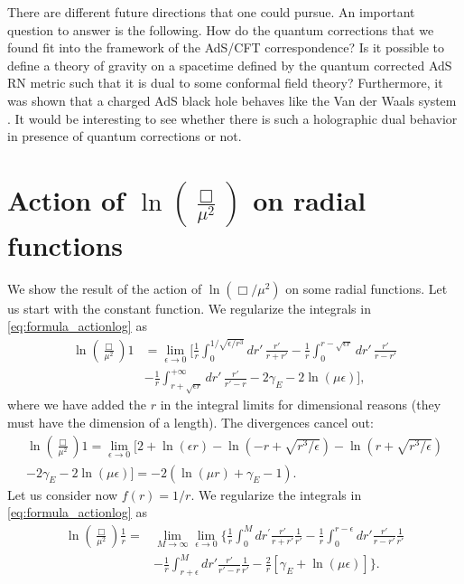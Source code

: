 \documentclass[10pt,a4paper]{article}
\begin{document}
There are different future directions that one could pursue. An important question to answer is the following. How do the quantum corrections that we found fit into the framework of the AdS/CFT correspondence? Is it possible to define a theory of gravity on a spacetime defined by the quantum corrected AdS RN metric such that it is dual to some conformal field theory? Furthermore, it was shown that a charged AdS black hole behaves like the Van der Waals system \cite{Kubiznak:2012wp}. It would be interesting to see whether there is such a holographic dual behavior in presence of quantum corrections or not.
\appendix
\section{Action of \texorpdfstring{$\ln\left(\frac{\Box}{\mu^2}\right)$}{TEXT} on radial functions}\label{sec:appendix}
We show the result of the action of $\ln\left(\Box/\mu^2\right)$ on some radial functions. Let us start with the constant function. We regularize the integrals in \eqref{eq:formula_actionlog} as
\begin{equation}
\begin{split}
    \ln\left(\frac{\Box}{\mu^2}\right)1&=\lim_{\epsilon\to 0}\bigg[\frac{1}{r}\int_0^{1/\sqrt{\epsilon/r^3}}dr'\,\frac{r'}{r+r'}- \frac{1}{r}\int_0^{r-\sqrt{\epsilon r}}dr'\,\frac{r'}{r-r'}\\
    &-\frac{1}{r}\int_{r+\sqrt{\epsilon r}}^{+\infty}dr'\,\frac{r'}{r'-r}
    -2\gamma_E-2\ln\left(\mu\epsilon\right)\bigg],
\end{split}
\end{equation}
where we have added the $r$ in the integral limits for dimensional reasons (they must have the dimension of a length). The divergences cancel out:
\begin{equation}
\begin{gathered}
     \ln\left(\frac{\Box}{\mu^2}\right)1=\lim_{\epsilon\to 0}\Big[2+\ln(\epsilon r)-\ln\left(-r+\sqrt{r^3/\epsilon}\right)-\ln\left(r+\sqrt{r^3/\epsilon}\right)\\-2\gamma_E-2\ln(\mu\epsilon)\Big]=-2(\ln(\mu r)+\gamma_E-1).
\end{gathered}
\end{equation}
Let us consider now $f(r)=1/r$. We regularize the integrals in \eqref{eq:formula_actionlog} as
\begin{equation}
\begin{split}
    \ln\left(\frac{\Box}{\mu^2}\right)\frac{1}{r}=&\lim_{M\to\infty}\lim_{\epsilon\to0}\bigg\{\frac{1}{r}\int_0^M dr^{'}\frac{r'}{r+r'}\frac{1}{r'}-\frac{1}{r}\int_0^{r-\epsilon}dr'\frac{r'}{r-r'}\frac{1}{r'}\\
    &-\frac{1}{r}\int_{r+\epsilon}^M dr'\frac{r'}{r'-r}\frac{1}{r'}-\frac{2}{r}\left[\gamma_E+\ln\left(\mu\epsilon\right)\right]\bigg\}.
\end{split}
\end{equation}
\end{document}
